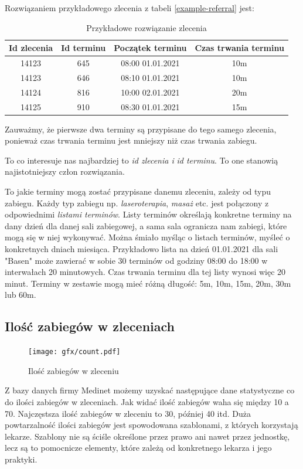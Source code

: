 Rozwiązaniem przykładowego zlecenia z tabeli \ref{example-referral}
jest:

\begin{table}[h]
	\centering
	\begin{tabular}{ | c | c | c | c | }
		\hline
	\bfseries Id zlecenia & \bfseries Id terminu & \bfseries Początek terminu & \bfseries Czas trwania terminu \\
	\hline
	14123 & 645 & 08:00 01.01.2021 & 10m \\
	\hline
	14123 & 646 & 08:10 01.01.2021 & 10m \\
	\hline
	14124 & 816 & 10:00 02.01.2021 & 20m \\
	\hline
	14125 & 910 & 08:30 01.01.2021 & 15m \\
	\hline
	\end{tabular}
	\caption{Przykładowe rozwiązanie zlecenia}
	\label{example-solution}
\end{table}

Zauważmy, że pierwsze dwa terminy są przypisane do tego samego zlecenia,
ponieważ czas trwania terminu jest mniejszy niż czas trwania zabiegu.

To co interesuje nas najbardziej to \emph{id zlecenia i} \emph{id terminu}. To
one stanowią najistotniejszy człon rozwiązania.

To jakie terminy mogą zostać przypisane danemu zleceniu,
zależy od typu zabiegu. Każdy typ zabiegu np. \emph{laseroterapia}, \emph{masaż} etc. jest
połączony z odpowiednimi \emph{listami terminów}. Listy terminów określają
konkretne terminy na dany dzień dla danej sali zabiegowej, a sama sala
ogranicza nam zabiegi, które mogą się w niej wykonywać. Można śmiało myśląc o
listach terminów, myśleć o konkretnych dniach miesiąca. Przykładowo lista na
dzień 01.01.2021 dla sali "Basen" może zawierać w sobie 30 terminów od godziny 08:00
do 18:00 w interwałach 20 minutowych. Czas trwania terminu dla tej listy wynosi
więc 20 minut. Terminy w zestawie mogą mieć różną długość: 5m, 10m, 15m, 20m, 30m
lub 60m. %
\newpage
\subsection{Ilość zabiegów w zleceniach}
\begin{figure}[h]
	\centering
	\texttt{[image: gfx/count.pdf]}
	\caption{Ilość zabiegów w zleceniu}
	\label{medinet-treatments-stats}
\end{figure}
Z bazy danych firmy Medinet możemy uzyskać następujące dane statystyczne co do
ilości zabiegów w zleceniach. Jak widać ilość zabiegów waha się między 10 a 70.
Najczęstsza ilość zabiegów w zleceniu to 30, później 40 itd. Duża powtarzalność
ilości zabiegów jest spowodowana szablonami, z których korzystają lekarze.
Szablony nie są ściśle określone przez prawo ani nawet przez jednostkę, lecz są
to pomocnicze elementy, które zależą od konkretnego lekarza i jego praktyki.
\newpage
